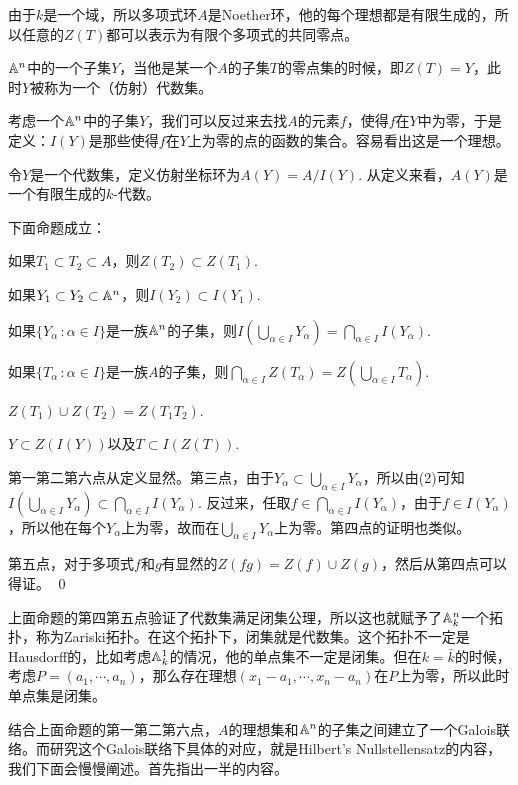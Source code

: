 由于$k$是一个域，所以多项式环$A$是Noether环，他的每个理想都是有限生成的，所以任意的$Z(T)$都可以表示为有限个多项式的共同零点。

\para $\mathbb{A}^n$中的一个子集$Y$，当他是某一个$A$的子集$T$的零点集的时候，即$Z(T)=Y$，此时$Y$被称为一个（仿射）代数集。

考虑一个$\mathbb{A}^n$中的子集$Y$，我们可以反过来去找$A$的元素$f$，使得$f$在$Y$中为零，于是定义：$I(Y)$是那些使得$f$在$Y$上为零的点的函数的集合。容易看出这是一个理想。

\para 令$Y$是一个代数集，定义仿射坐标环为$A(Y)=A/I(Y)$. 从定义来看，$A(Y)$是一个有限生成的$k$-代数。

\pro 下面命题成立：

 如果$T_1\subset T_2 \subset A$，则$Z(T_2)\subset Z(T_1)$.

 如果$Y_1\subset Y_2 \subset \mathbb{A}^n$，则$I(Y_2)\subset I(Y_1)$.

 如果$\{Y_\alpha\,:\alpha\in I\}$是一族$\mathbb{A}^n$的子集，则$I\left(\bigcup_{\alpha\in I} Y_\alpha\right)=\bigcap_{\alpha\in I} I(Y_\alpha)$.

 如果$\{T_\alpha\,:\alpha\in I\}$是一族$A$的子集，则$\bigcap_{\alpha\in I} Z(T_\alpha)=Z\left(\bigcup_{\alpha\in I} T_\alpha\right)$.

 $Z(T_1)\cup Z(T_2)=Z(T_1T_2)$.

 $Y\subset Z(I(Y))$以及$T\subset I(Z(T))$.

\proof
	第一第二第六点从定义显然。第三点，由于$Y_\alpha\subset \bigcup_{\alpha\in I} Y_\alpha$，所以由(2)可知$I\left(\bigcup_{\alpha\in I} Y_\alpha\right)\subset\bigcap_{\alpha\in I} I(Y_\alpha)$. 反过来，任取$f\in \bigcap_{\alpha\in I} I(Y_\alpha)$，由于$f\in I(Y_\alpha)$，所以他在每个$Y_\alpha$上为零，故而在$\bigcup_{\alpha\in I} Y_\alpha$上为零。第四点的证明也类似。

	第五点，对于多项式$f$和$g$有显然的$Z(fg)=Z(f)\cup Z(g)$，然后从第四点可以得证。
\qed

上面命题的第四第五点验证了代数集满足闭集公理，所以这也就赋予了$\mathbb{A}^n_k$一个拓扑，称为Zariski拓扑。在这个拓扑下，闭集就是代数集。这个拓扑不一定是Hausdorff的，比如考虑$\mathbb{A}^1_k$的情况，他的单点集不一定是闭集。但在$k=\bar{k}$的时候，考虑$P=(a_1,\cdots ,a_n)$，那么存在理想$(x_1-a_1,\cdots,x_n-a_n)$在$P$上为零，所以此时单点集是闭集。

结合上面命题的第一第二第六点，$A$的理想集和$\mathbb{A}^n$的子集之间建立了一个Galois联络。而研究这个Galois联络下具体的对应，就是Hilbert's Nullstellensatz的内容，我们下面会慢慢阐述。首先指出一半的内容。

